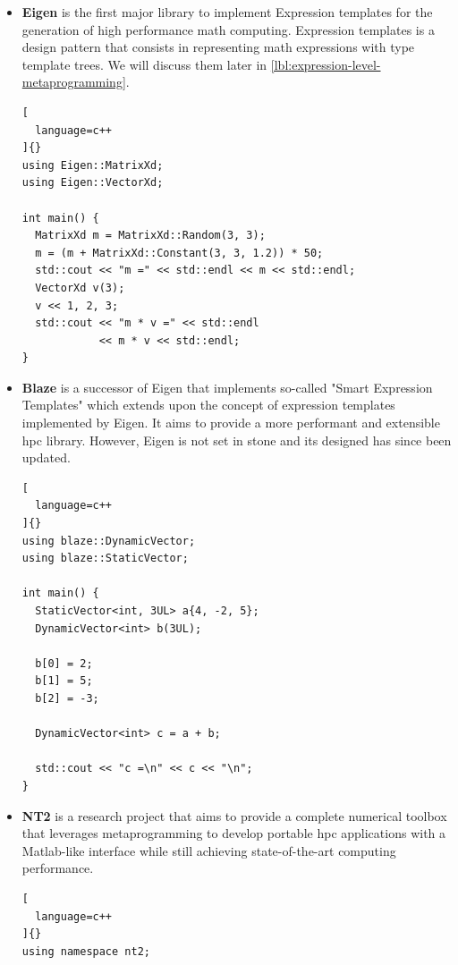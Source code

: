 \documentclass[../main]{subfiles}
\begin{document}
\begin{itemize}

  \item

\textbf{Eigen} \cite{eigen} is the first major \cpp library to implement
Expression templates for the generation of high performance math computing.
Expression templates is a \cpp design pattern that consists in representing
math expressions with type template trees. We will discuss them later
in \ref{lbl:expression-level-metaprogramming}.

\begin{lstlisting}[
  language=c++
]{}
using Eigen::MatrixXd;
using Eigen::VectorXd;

int main() {
  MatrixXd m = MatrixXd::Random(3, 3);
  m = (m + MatrixXd::Constant(3, 3, 1.2)) * 50;
  std::cout << "m =" << std::endl << m << std::endl;
  VectorXd v(3);
  v << 1, 2, 3;
  std::cout << "m * v =" << std::endl
            << m * v << std::endl;
}
\end{lstlisting}

  \item

\textbf{Blaze} \cite{blazelib} is a successor of Eigen that implements so-called
"Smart Expression Templates" which extends upon the concept of
expression templates implemented by Eigen. It aims to provide a more performant
and extensible \gls{hpc} library. However, Eigen is not set in stone
and its designed has since been updated.

\begin{lstlisting}[
  language=c++
]{}
using blaze::DynamicVector;
using blaze::StaticVector;

int main() {
  StaticVector<int, 3UL> a{4, -2, 5};
  DynamicVector<int> b(3UL);

  b[0] = 2;
  b[1] = 5;
  b[2] = -3;

  DynamicVector<int> c = a + b;

  std::cout << "c =\n" << c << "\n";
}
\end{lstlisting}

  \item

\textbf{NT2} \cite{nt2} is a research project that aims to provide a complete
numerical toolbox that leverages metaprogramming to develop portable \gls{hpc}
applications with a Matlab-like interface while still achieving state-of-the-art
computing performance.

\begin{lstlisting}[
  language=c++
]{}
using namespace nt2;


\end{lstlisting}
\end{itemize}
\end{document}
